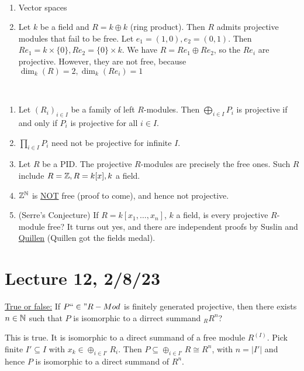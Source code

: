 \documentclass[x11names,reqno,14pt]{extarticle}
\newcommand{\fin}{``\in"}
\begin{document}
\exm\,

\begin{enumerate}

\item Vector spaces

\item Let $k$ be a field and $R = k\oplus k$ (ring product). Then $R$ admits projective modules that fail to be free. Let $e_1 = (1, 0), e_2 = (0, 1)$. Then $Re_1 = k\times\{0\}, Re_2 = \{0\}\times k$. We have $R  = Re_1\oplus Re_2$, so the $Re_i$ are projective. However, they are not free, because $\dim_k(R) = 2, \dim_k(Re_i) = 1$

\end{enumerate}

\rem\,

\begin{enumerate}

\item Let $(R_i)_{i\in I}$ be a family of left $R$-modules. Then $\bigoplus_{i\in I}P_i$ is projective if and only if $P_i$ is projective for all $i\in I$. 
\dbend

\item $\prod_{i\in I}P_i$ need not be projective for infinite $I$.

\item Let $R$ be a PID. The projective $R$-modules are precisely the free ones. Such $R$ include $R = \mathbb{Z}, R = k[x], k$ a field.  

\item $\mathbb{Z}^{\mathbb{N}}$ is \underline{NOT} free (proof to come), and hence not projective. 

\item (Serre's Conjecture) If $R = k[x_1, \dots, x_n]$, $k$ a field, is every projective $R$-module free? It turns out yes, and there are independent proofs by Suslin and \underline{Quillen} (Quillen got the fields medal).

\end{enumerate}

\section*{Lecture 12, 2/8/23}

\underline{True or false:} If $P\fin R-Mod$ is finitely generated projective, then there exists $n \in \mathbb{N}$ such that $P$ is isomorphic to a dirrect summand $_RR^n$? 

This is true. It is isomorphic to a direct summand of a free module $R^{(I)}$. Pick finite $I'\subseteq I$ with $x_k\in\oplus_{i\in I'}R_i$. Then $P \subseteq \oplus_{i\in I'}R \cong R^n$, with $n = |I'|$ and hence $P$ is isomorphic to a direct summand of $R^n$. 
\end{document}
